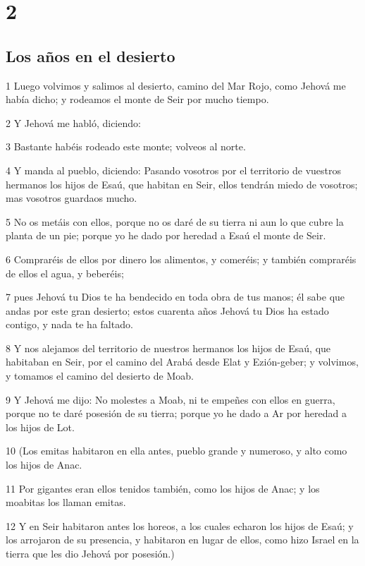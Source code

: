 \chapter{2}

\section{Los años en el desierto}

\par 1 Luego volvimos y salimos al desierto, camino del Mar Rojo, como Jehová me había dicho; y rodeamos el monte de Seir por mucho tiempo.
\par 2 Y Jehová me habló, diciendo:
\par 3 Bastante habéis rodeado este monte; volveos al norte.
\par 4 Y manda al pueblo, diciendo: Pasando vosotros por el territorio de vuestros hermanos los hijos de Esaú, que habitan en Seir, ellos tendrán miedo de vosotros; mas vosotros guardaos mucho.
\par 5 No os metáis con ellos, porque no os daré de su tierra ni aun lo que cubre la planta de un pie; porque yo he dado por heredad a Esaú el monte de Seir.
\par 6 Compraréis de ellos por dinero los alimentos, y comeréis; y también compraréis de ellos el agua, y beberéis;
\par 7 pues Jehová tu Dios te ha bendecido en toda obra de tus manos; él sabe que andas por este gran desierto; estos cuarenta años Jehová tu Dios ha estado contigo, y nada te ha faltado.
\par 8 Y nos alejamos del territorio de nuestros hermanos los hijos de Esaú, que habitaban en Seir, por el camino del Arabá desde Elat y Ezión-geber; y volvimos, y tomamos el camino del desierto de Moab.
\par 9 Y Jehová me dijo: No molestes a Moab, ni te empeñes con ellos en guerra, porque no te daré posesión de su tierra; porque yo he dado a Ar por heredad a los hijos de Lot.
\par 10 (Los emitas habitaron en ella antes, pueblo grande y numeroso, y alto como los hijos de Anac.
\par 11 Por gigantes eran ellos tenidos también, como los hijos de Anac; y los moabitas los llaman emitas.
\par 12 Y en Seir habitaron antes los horeos, a los cuales echaron los hijos de Esaú; y los arrojaron de su presencia, y habitaron en lugar de ellos, como hizo Israel en la tierra que les dio Jehová por posesión.)
